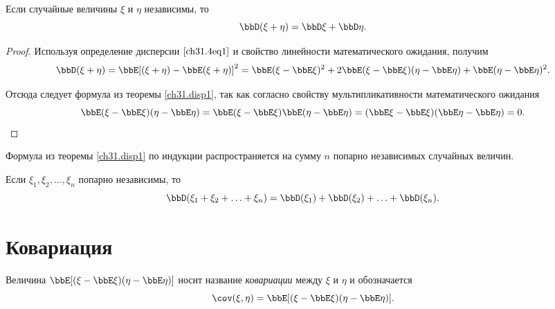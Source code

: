 \begin{thm}\label{ch31.disp1}
Если случайные величины $\xi$ и $\eta$ независимы, то $$\bbD(\xi + \eta) = \bbD\xi + \bbD\eta.$$
\end{thm}
\begin{proof}
Используя определение дисперсии $\eqref{ch31.4eq1}$ и свойство линейности математического ожидания, получим
$$
\bbD(\xi + \eta) = \bbE[(\xi + \eta) - \bbE(\xi + \eta)]^2 = \bbE(\xi - \bbE\xi)^2 + 2\bbE(\xi - \bbE\xi)(\eta - \bbE\eta) + \bbE(\eta  - \bbE\eta)^2.
$$

Отсюда следует формула из теоремы \ref{ch31.disp1}, так как согласно свойству мультипликативности математического ожидания
\begin{equation*}
\bbE(\xi - \bbE\xi)(\eta - \bbE\eta) = \bbE(\xi - \bbE\xi)\bbE(\eta - \bbE\eta) = (\bbE\xi - \bbE\xi)(\bbE\eta - \bbE\eta) = 0. \qedhere
\end{equation*}
\end{proof}

Формула из теоремы \ref{ch31.disp1} по индукции распространяется на сумму $n$ попарно независимых случайных величин. 
\begin{cons}\label{ch31.disp13}
Если $\xi_1,\xi_2, \ldots, \xi_n$ попарно независимы, то 
$$
\bbD(\xi_1 + \xi_2 + \ldots + \xi_n) = \bbD(\xi_1) + \bbD(\xi_2) + \ldots + \bbD(\xi_n).
$$
\end{cons}

\section{Ковариация}
\begin{defn}
Величина $\bbE[(\xi - \bbE\xi)(\eta - \bbE\eta)]$ носит название \textit{ковариации} между $\xi$ и $\eta$ и обозначается $$\cov (\xi,\eta) = \bbE[(\xi - \bbE\xi)(\eta - \bbE\eta)].$$
\end{defn}

